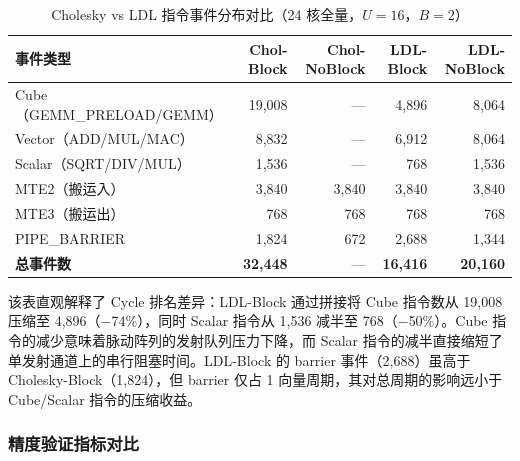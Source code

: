 \documentclass{CjC}
\begin{document}
    \begin{table}[H]
        \centering
        \caption{Cholesky vs LDL 指令事件分布对比（24 核全量，$U=16$，$B=2$）}
        \label{tab:five-inst-stats}
        \begin{tabular}{l r r r r}
            \toprule \textbf{事件类型}            & \textbf{Chol-Block} & \textbf{Chol-NoBlock} & \textbf{LDL-Block} & \textbf{LDL-NoBlock} \\
            \midrule Cube（GEMM\_PRELOAD/GEMM） & 19,008              & —                     & 4,896              & 8,064                \\
            Vector（ADD/MUL/MAC）               & 8,832               & —                     & 6,912              & 8,064                \\
            Scalar（SQRT/DIV/MUL）              & 1,536               & —                     & 768                & 1,536                \\
            MTE2（搬运入）                         & 3,840               & 3,840                 & 3,840              & 3,840                \\
            MTE3（搬运出）                         & 768                 & 768                   & 768                & 768                  \\
            PIPE\_BARRIER                     & 1,824               & 672                   & 2,688              & 1,344                \\
            \midrule \textbf{总事件数}            & \textbf{32,448}     & —                     & \textbf{16,416}    & \textbf{20,160}      \\
            \bottomrule
        \end{tabular}
    \end{table}

    该表直观解释了 Cycle 排名差异：LDL-Block 通过拼接将 Cube 指令数从 19,008 压缩至
    4,896（$-$74\%），同时 Scalar 指令从 1,536 减半至 768（$-$50\%）。Cube 指令的减少意味着脉动阵列的发射队列压力下降，而
    Scalar 指令的减半直接缩短了单发射通道上的串行阻塞时间。LDL-Block 的 barrier 事件（2,688）虽高于
    Cholesky-Block（1,824），但 barrier 仅占 1 向量周期，其对总周期的影响远小于 Cube/Scalar
    指令的压缩收益。

    \subsubsection{精度验证指标对比}
\end{document}

